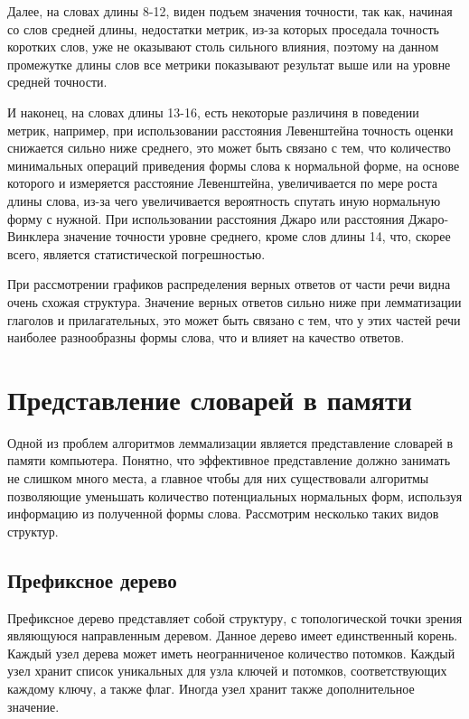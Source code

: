 \documentclass[12pt, a4paper]{article}
\begin{document}
Далее, на словах длины 8-12, виден подъем значения точности, так как, начиная со слов  средней длины, недостатки метрик, из-за которых проседала точность коротких слов, уже не оказывают столь сильного влияния, поэтому на данном промежутке длины слов все метрики показывают результат выше или на уровне средней точности.

И наконец, на словах длины 13-16, есть некоторые различиня в поведении метрик, например, при использовании расстояния Левенштейна точность оценки снижается сильно ниже среднего, это может быть связано с тем, что количество минимальных операций приведения формы слова к нормальной форме, на основе которого и измеряется расстояние Левенштейна, увеличивается по мере роста длины слова, из-за чего увеличивается вероятность спутать иную нормальную форму с нужной. При использовании расстояния Джаро или расстояния Джаро-Винклера значение точности уровне среднего, кроме слов длины 14, что, скорее всего, является статистической погрешностью.

\newpage

При рассмотрении графиков распределения верных ответов от части речи видна очень схожая структура. Значение верных ответов сильно ниже при лемматизации глаголов и прилагательных, это может быть связано с тем, что у этих частей речи наиболее разнообразны формы слова, что и влияет на качество ответов.

\section{Представление словарей в памяти}
\quad Одной из проблем алгоритмов леммализации является представление словарей в памяти компьютера. Понятно, что эффективное представление должно занимать не слишком много места, а главное чтобы для них существовали алгоритмы позволяющие уменьшать количество потенциальных нормальных форм, используя информацию из полученной формы слова. Рассмотрим несколько таких видов структур.

\subsection{Префиксное дерево}
\quad Префиксное дерево представляет собой структуру, с топологической точки зрения являющуюся направленным деревом. Данное дерево имеет единственный корень. Каждый узел дерева может иметь неогранниченое количество потомков. Каждый узел хранит список уникальных для узла ключей и потомков, соответствующих каждому ключу, а также флаг. Иногда узел хранит также дополнительное значение.
\end{document}

